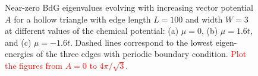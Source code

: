 \documentclass[aps,prb,showpacs,amsmath,twocolumn,amssymb,superscriptaddress]{revtex4-2}
\newcommand{\Red}[1]{\textcolor{red}{#1}}
\begin{document}
\begin{figure}[]
  \hfill
  \hfill
  \hfill
  \caption{Near-zero BdG eigenvalues evolving with increasing vector potential $A$ for a hollow triangle with edge length $L=100$ and width $W=3$ at different values of the chemical potential: (a) $\mu=0$, (b) $\mu=1.6t$, and (c) $\mu=-1.6t$. Dashed lines correspond to the lowest eigen-energies of the three edges with periodic boundary condition. \Red{Plot the figures from $A=0$ to $4\pi/\sqrt{3}$.}}
  \label{fig: spectral-flows}
\end{figure}
\end{document}
